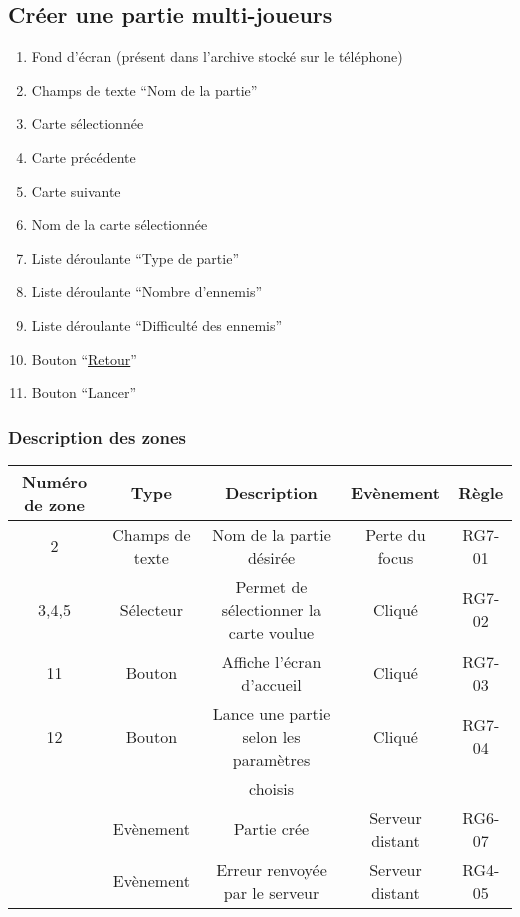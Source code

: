 \documentclass{report}
\begin{document}
	\subsection{Créer une partie multi-joueurs}
	
		\hypertarget{Creer partie multi-joueurs}{}
		\label{Creer partie multi-joueurs}
	
		\begin{center}
			
		\end{center}
		
		\begin{enumerate}
		  \item Fond d'écran (présent dans l'archive stocké sur le téléphone)
		  \item Champs de texte ``Nom de la partie''
		  \item Carte sélectionnée
		  \item Carte précédente
		  \item Carte suivante
		  \item Nom de la carte sélectionnée
		  \item Liste déroulante ``Type de partie''
		  \item Liste déroulante ``Nombre d'ennemis''
		  \item Liste déroulante ``Difficulté des ennemis''
		  \item Bouton ``\hyperlink{Accueil multi-joueurs}{Retour}''
		  \item Bouton ``Lancer'' 
		\end{enumerate}

		\subsubsection{Description des zones}
		
			\begin{tabular}{|c|c|c|c|c|} \hline
				Numéro de zone & Type  & Description & Evènement &	Règle \\\hline
				2 & Champs de texte & Nom de la partie désirée & Perte du focus & RG7-01 \\\hline
				3,4,5 & Sélecteur & Permet de sélectionner la carte voulue & Cliqué & RG7-02 \\\hline
				11 & Bouton & Affiche l'écran d'accueil & Cliqué & RG7-03 \\\hline
				12 & Bouton & Lance une partie selon les paramètres & Cliqué & RG7-04 \\
				   &        & choisis &        & \\\hline
				   & Evènement & Partie crée & Serveur distant & RG6-07 \\\hline
				   & Evènement & Erreur renvoyée par le serveur & Serveur distant & RG4-05 \\\hline
			\end{tabular}
			
\end{document}
